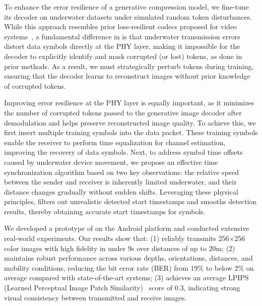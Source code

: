 To enhance the error resilience of a generative compression model,
we fine-tune its decoder on underwater datasets
under simulated random token disturbances.
While this approach resembles prior loss-resilient codecs
proposed for video
systems~\cite{nsdi24_grace,li2024reparolossresilientgenerativecodec},
a fundamental difference in \sysname is that underwater transmission errors
distort data symbols directly at the PHY layer,
making it impossible for the decoder to explicitly identify and mask
corrupted (or lost) tokens, as done in prior methods.
As a result, we must strategically perturb tokens during training,
ensuring that the decoder learns to reconstruct images without prior knowledge
of corrupted tokens.

Improving error resilience at the PHY layer is equally important,
as it minimizes the number of corrupted tokens passed to the generative
image decoder after demodulation and helps preserve reconstructed
image quality.
To achieve this, we first insert multiple training symbols into
the data packet. These training symbols enable the receiver to perform
time equalization for channel estimation, improving the recovery of data
symbols. Next, to address symbol time offsets caused by underwater device
movement, we propose an effective time synchronization algorithm
based on two key observations: the relative speed between the sender and
receiver is inherently limited underwater,
and their distance changes gradually without sudden shifts.
Leveraging these physical principles,
\sysname filters out unrealistic detected start timestamps and smooths detection
results, thereby obtaining accurate start timestamps for symbols.


We developed a prototype of \sysname on the Android platform
and conducted extensive real-world experiments.
Our results show that:
(1) \sysname reliably transmits 256$\times$256 color images with high fidelity
in under 9s over distances of up to 20m;
(2) \sysname maintains robust performance across various depths,
orientations, distances, and mobility conditions, reducing the bit error
rate (BER) from 19\% to below 2\% on average compared with state-of-the-art
systems;
(3) \sysname achieves an average LPIPS (Learned Perceptual Image Patch
Similarity)~\cite{zhang2018unreasonable} score of 0.3, indicating strong
visual consistency between transmitted and receive images.

